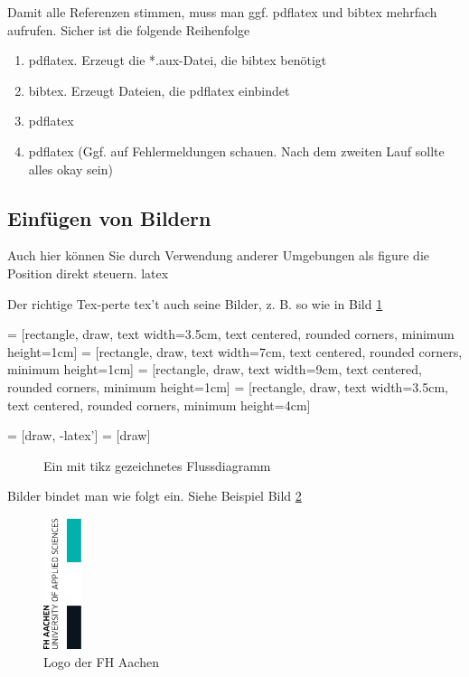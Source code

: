 Damit alle Referenzen stimmen, muss man ggf. pdflatex und bibtex mehrfach aufrufen. Sicher ist die folgende Reihenfolge
\begin{enumerate}
\item pdflatex. Erzeugt die *.aux-Datei, die bibtex benötigt
\item bibtex. Erzeugt Dateien, die pdflatex einbindet
\item pdflatex
\item pdflatex (Ggf. auf Fehlermeldungen schauen. Nach dem zweiten Lauf sollte alles okay sein)
\end{enumerate}



\subsection{Einfügen von Bildern}


Auch hier können Sie durch Verwendung anderer Umgebungen als figure die Position direkt steuern. \Gls{latex} 

Der richtige Tex-perte tex't auch seine Bilder, z. B. so wie in Bild \ref{bild2}

	 = [rectangle, draw, 
    text width=3.5cm, text centered, rounded corners, minimum height=1cm]
	 = [rectangle, draw, 
    text width=7cm, text centered, rounded corners, minimum height=1cm]
	 = [rectangle, draw, 
    text width=9cm, text centered, rounded corners, minimum height=1cm]
	 = [rectangle, draw, 
    text width=3.5cm, text centered, rounded corners, minimum height=4cm]
	 
	 = [draw, -latex']
	 = [draw]

\begin{figure}
\caption{Ein mit tikz gezeichnetes Flussdiagramm}
\label{bild2}
\end{figure}

Bilder bindet man wie folgt ein. Siehe Beispiel Bild \ref{bild1}

\begin{figure}[h]
\centering
\includegraphics[width=0.1\textwidth]{img/fh_logo.png}
\caption{Logo der FH Aachen}
\label{bild1}
\end{figure}


\blindtext

